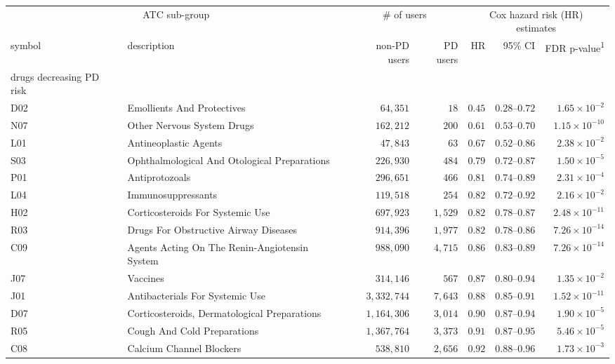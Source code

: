 \captionsetup[table]{labelformat=empty,skip=1pt}
\setlength{\LTpost}{0mm}
\begin{longtable}{llrrrrr}
\toprule
\multicolumn{2}{c}{ATC sub-group} & \multicolumn{2}{c}{\# of users} & \multicolumn{3}{c}{Cox hazard risk (HR) estimates} \\ 
\cmidrule(lr){1-2} \cmidrule(lr){3-4} \cmidrule(lr){5-7}
symbol & description & non-PD users & PD users & HR & 95\% CI & FDR p-value\textsuperscript{1} \\ 
\midrule
\multicolumn{1}{l}{drugs decreasing PD risk} \\ 
\midrule
D02 & Emollients And Protectives & $64,351$ & $18$ & $0.45$ & $0.28$–$0.72$ & $1.65 \times 10^{-2}$ \\ 
N07 & Other Nervous System Drugs & $162,212$ & $200$ & $0.61$ & $0.53$–$0.70$ & $1.15 \times 10^{-10}$ \\ 
L01 & Antineoplastic Agents & $47,843$ & $63$ & $0.67$ & $0.52$–$0.86$ & $2.38 \times 10^{-2}$ \\ 
S03 & Ophthalmological And Otological Preparations & $226,930$ & $484$ & $0.79$ & $0.72$–$0.87$ & $1.50 \times 10^{-5}$ \\ 
P01 & Antiprotozoals & $296,651$ & $466$ & $0.81$ & $0.74$–$0.89$ & $2.31 \times 10^{-4}$ \\ 
L04 & Immunosuppressants & $119,518$ & $254$ & $0.82$ & $0.72$–$0.92$ & $2.16 \times 10^{-2}$ \\ 
H02 & Corticosteroids For Systemic Use & $697,923$ & $1,529$ & $0.82$ & $0.78$–$0.87$ & $2.48 \times 10^{-11}$ \\ 
R03 & Drugs For Obstructive Airway Diseases & $914,396$ & $1,977$ & $0.82$ & $0.78$–$0.86$ & $7.26 \times 10^{-14}$ \\ 
C09 & Agents Acting On The Renin-Angiotensin System & $988,090$ & $4,715$ & $0.86$ & $0.83$–$0.89$ & $7.26 \times 10^{-14}$ \\ 
J07 & Vaccines & $314,146$ & $567$ & $0.87$ & $0.80$–$0.94$ & $1.35 \times 10^{-2}$ \\ 
J01 & Antibacterials For Systemic Use & $3,332,744$ & $7,643$ & $0.88$ & $0.85$–$0.91$ & $1.52 \times 10^{-11}$ \\ 
D07 & Corticosteroids, Dermatological Preparations & $1,164,306$ & $3,014$ & $0.90$ & $0.87$–$0.94$ & $1.90 \times 10^{-5}$ \\ 
R05 & Cough And Cold Preparations & $1,367,764$ & $3,373$ & $0.91$ & $0.87$–$0.95$ & $5.46 \times 10^{-5}$ \\ 
C08 & Calcium Channel Blockers & $538,810$ & $2,656$ & $0.92$ & $0.88$–$0.96$ & $1.73 \times 10^{-3}$ \\ 

\end{longtable}
